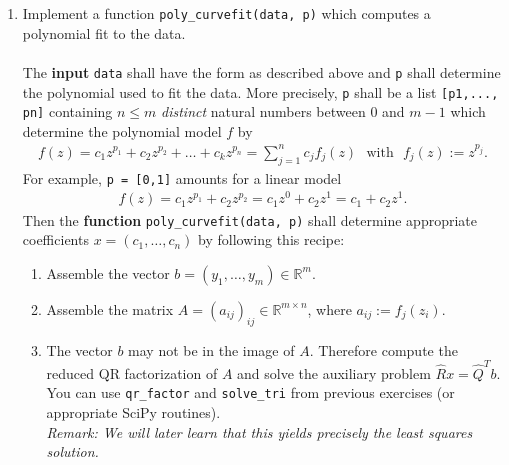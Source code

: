 \begin{enumerate}
	\item Implement a function \verb|poly_curvefit(data, p)| which computes a polynomial fit to the data.\\ ~\\
	The \textbf{input} \verb|data| shall have the form as described above and \verb|p| shall determine the polynomial used to fit the data. More precisely, \verb|p| shall be a list \verb|[p1,..., pn]| containing $n \leq m$ \textit{distinct} natural numbers between $0$ and $m-1$ which determine the polynomial model $f$ by
	\begin{align*}
	  f(z) = c_1 z^{p_1} + c_2 z^{p_2} + \ldots +  c_k z^{p_n} = \sum_{j=1}^n c_j f_j(z) ~~~\text{with}~~~f_j(z) := z^{p_j}.
	\end{align*}
	For example, \verb|p = [0,1]| amounts for a linear model
	\begin{align*}
		f(z) = c_1 z^{p_1} + c_2 z^{p_2}  = c_1 z^0 + c_2 z^1 = c_1 + c_2 z^1.
	\end{align*}
	Then the \textbf{function} \verb|poly_curvefit(data, p)| shall determine appropriate coefficients $x = (c_1,\ldots, c_n)$ by following this recipe:
	\begin{enumerate}
		\item Assemble the vector $b = (y_1,\ldots,y_m)\in \mathbb{R}^m$.
		\item Assemble the matrix $A = (a_{ij})_{ij} \in \mathbb{R}^{m \times n}$, where $a_{ij} := f_j(z_i)$.
		\item The vector $b$ may not be in the image of $A$. Therefore compute the reduced QR factorization of $A$ and solve the auxiliary problem $\widehat{R}x = \widehat{Q}^Tb$. You can use \texttt{qr\_factor} and \texttt{solve\_tri} from previous exercises (or appropriate SciPy routines).\\
		\textit{Remark: We will later learn that this yields precisely the least squares solution.}
		

\end{enumerate}
\end{enumerate}
